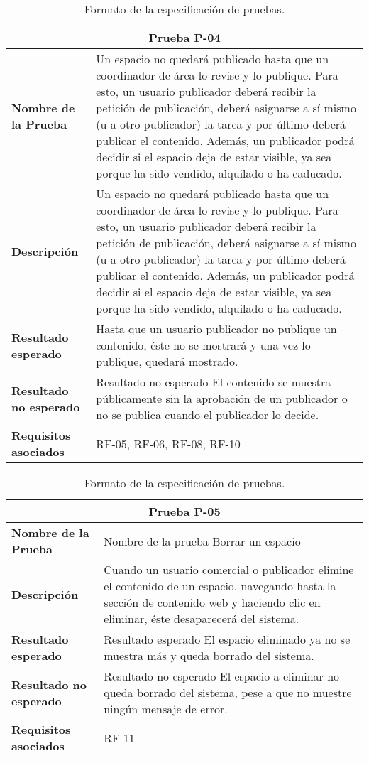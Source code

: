 \begin{table}[h]
\begin{center}
\begin{tabular}{ l l }
\multicolumn{2}{c}{Prueba P-04} \\ \hline
\textbf{Nombre de la Prueba} & Un espacio no quedará publicado hasta que un coordinador de área lo revise y lo publique. Para esto, un usuario publicador deberá recibir la petición de publicación, deberá asignarse a sí mismo (u a otro publicador) la tarea y por último deberá publicar el contenido. Además, un publicador podrá decidir si el espacio deja de estar visible, ya sea porque ha sido vendido, alquilado o ha caducado. \\
\textbf{Descripción} & Un espacio no quedará publicado hasta que un coordinador de área lo revise y lo publique. Para esto, un usuario publicador deberá recibir la petición de publicación, deberá asignarse a sí mismo (u a otro publicador) la tarea y por último deberá publicar el contenido. Además, un publicador podrá decidir si el espacio deja de estar visible, ya sea porque ha sido vendido, alquilado o ha caducado. \\
\textbf{Resultado esperado} & Hasta que un usuario publicador no publique un contenido, éste no se mostrará y una vez lo publique, quedará mostrado. \\
\textbf{Resultado no esperado} & Resultado no esperado	El contenido se muestra públicamente sin la aprobación de un publicador o no se publica cuando el publicador lo decide.\\
\textbf{Requisitos asociados} & RF-05, RF-06, RF-08, RF-10 \\ \hline
\end{tabular}
\caption{Formato de la especificación de pruebas.}
\label{tab:P4}
\end{center}
\end{table}

\begin{table}[h]
\begin{center}
\begin{tabular}{ l l }
\multicolumn{2}{c}{Prueba P-05} \\ \hline
\textbf{Nombre de la Prueba} & Nombre de la prueba	Borrar un espacio \\
\textbf{Descripción} & Cuando un usuario comercial o publicador elimine el contenido de un espacio, navegando hasta la sección de contenido web y haciendo clic en eliminar, éste desaparecerá del sistema.  \\
\textbf{Resultado esperado} & Resultado esperado	El espacio eliminado ya no se muestra más y queda borrado del sistema. \\
\textbf{Resultado no esperado} & Resultado no esperado	El espacio a eliminar no queda borrado del sistema, pese a que no muestre ningún mensaje de error. \\
\textbf{Requisitos asociados} & RF-11 \\ \hline
\end{tabular}
\caption{Formato de la especificación de pruebas.}
\label{tab:P5}
\end{center}
\end{table}


